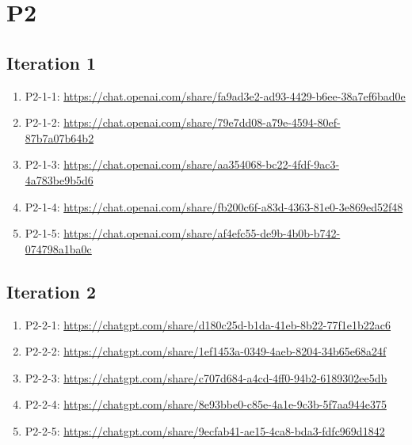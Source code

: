 \section{P2\label{P2-1}}

\subsection{Iteration 1}

\begin{enumerate}
    \item P2-1-1: \href{https://chat.openai.com/share/fa9ad3e2-ad93-4429-b6ee-38a7ef6bad0e}{https://chat.openai.com/share/fa9ad3e2-ad93-4429-b6ee-38a7ef6bad0e}
    \item P2-1-2: \href{https://chat.openai.com/share/79e7dd08-a79e-4594-80ef-87b7a07b64b2}{https://chat.openai.com/share/79e7dd08-a79e-4594-80ef-87b7a07b64b2}
    \item P2-1-3: \href{https://chat.openai.com/share/aa354068-bc22-4fdf-9ac3-4a783be9b5d6}{https://chat.openai.com/share/aa354068-bc22-4fdf-9ac3-4a783be9b5d6}
    \item P2-1-4: \href{https://chat.openai.com/share/fb200c6f-a83d-4363-81e0-3e869ed52f48}{https://chat.openai.com/share/fb200c6f-a83d-4363-81e0-3e869ed52f48}
    \item P2-1-5: \href{https://chat.openai.com/share/af4efc55-de9b-4b0b-b742-074798a1ba0c}{https://chat.openai.com/share/af4efc55-de9b-4b0b-b742-074798a1ba0c}
\end{enumerate}

\subsection{Iteration 2}

\begin{enumerate}
    \item P2-2-1: \href{https://chatgpt.com/share/d180c25d-b1da-41eb-8b22-77f1e1b22ac6}{https://chatgpt.com/share/d180c25d-b1da-41eb-8b22-77f1e1b22ac6}
    \item P2-2-2: \href{https://chatgpt.com/share/1ef1453a-0349-4aeb-8204-34b65e68a24f}{https://chatgpt.com/share/1ef1453a-0349-4aeb-8204-34b65e68a24f}
    \item P2-2-3: \href{https://chatgpt.com/share/c707d684-a4cd-4ff0-94b2-6189302ee5db}{https://chatgpt.com/share/c707d684-a4cd-4ff0-94b2-6189302ee5db}
    \item P2-2-4: \href{https://chatgpt.com/share/8e93bbe0-c85e-4a1e-9c3b-5f7aa944e375}{https://chatgpt.com/share/8e93bbe0-c85e-4a1e-9c3b-5f7aa944e375}
    \item P2-2-5: \href{https://chatgpt.com/share/9ecfab41-ae15-4ca8-bda3-fdfc969d1842}{https://chatgpt.com/share/9ecfab41-ae15-4ca8-bda3-fdfc969d1842}
\end{enumerate}

